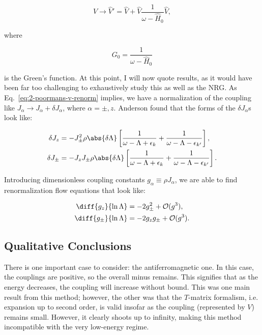 \begin{equation}
  \hat{V} \rightarrow \hat{V}' = \hat{V} + \hat{V} \frac{1}{\omega - \hat{H}_0}\hat{V},\label{eq:2-poormans-v-renorm}
\end{equation}

where

\begin{equation}
  G_0 = \frac{1}{\omega - \hat{H}_0}
\end{equation}

is the Green's function. At this point, I will now quote results, as it would have been far too challenging to exhaustively study this as well as the NRG. As Eq.~\eqref{eq:2-poormans-v-renorm} implies, we have a normalization of the coupling like $J_\alpha \rightarrow J_\alpha + \delta J_\alpha$, where $\alpha = \pm,z$. Anderson found that the forms of the $\delta J_\alpha$s look like:

\begin{align}
  \delta J_z &= -J_\pm^2 \rho \abs{\delta\Lambda} \left[ \frac{1}{\omega - \Lambda + \epsilon_k} + \frac{1}{\omega - \Lambda - \epsilon_{k'}} \right], \\
  \delta J_\pm &= -J_z J_\pm \rho \abs{\delta\Lambda} \left[ \frac{1}{\omega - \Lambda + \epsilon_k} + \frac{1}{\omega - \Lambda - \epsilon_{k'}} \right].
\end{align}

Introducing dimensionless coupling constants $g_\alpha \equiv \rho J_\alpha$, we are able to find renormalization flow equations that look like:

\begin{align}
  \diff{g_z}{\ln\Lambda} &= -2g_\pm^2 + \mathcal{O}(g^3), \\
  \diff{g_\pm}{\ln\Lambda} &= -2g_z g_\pm + \mathcal{O}(g^3).
\end{align}


\subsection{Qualitative Conclusions}

There is one important case to consider: the antiferromagnetic one. In this case, the couplings are positive, so the overall minus remains. This signifies that as the energy decreases, the coupling will increase without bound. This was one main result from this method; however, the other was that the $T$-matrix formalism, i.e. expansion up to second order, is valid insofar as the coupling (represented by $V$) remains small. However, it clearly shoots up to infinity, making this method incompatible with the very low-energy regime.

